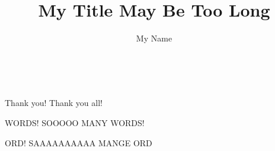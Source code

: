 

\newcommand{\thesistitle}{
\HRule \\[2mm] %
{\huge \bfseries \textsc{Fra Hades \\[1mm]
		of \\[1mm]
		Doom
	}}\\[2mm]
	\HRule \\[1.5cm] %
}

\newcommand{\thistitle}{My Title May Be Too Long}
\newcommand{\thisauthor}{My Name}

\title{\texorpdfstring{\Large\color{rossoCP3}\thistitle}{\thistitle}} %
\author{\thisauthor}

\toggletrue{final}


	
\restoregeometry

\thispagestyle{empty}
\clearpage
\ \thispagestyle{empty}\clearpage
{}

Thank you! Thank you all!


\clearpage
\begin{KeepFromToc} %
  \tableofcontents
\end{KeepFromToc}
 

WORDS! SOOOOO MANY WORDS!


ORD! SAAAAAAAAAA MANGE ORD


\cleardoublepage
{}

\fancyhead[LO]{\slshape \rightmark}\fancyhead[RE]{\slshape \leftmark} %


%
